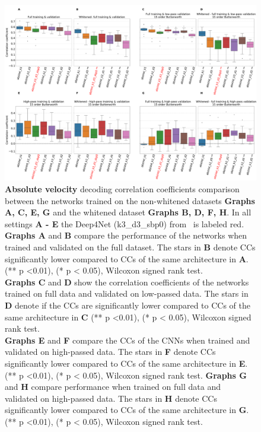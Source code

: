 \begin{figure}[!htbp]
   \includegraphics[width=1\linewidth]{img/ch4/absVel-pw-vs-non-pw-performance}
\caption[Spectral whitening - performance comparison]{\textbf{Absolute velocity} decoding correlation coefficients comparison between the networks trained on the non-whitened datasets \textbf{Graphs A, C, E, G} and the whitened dataset \textbf{Graphs B, D, F, H}.
   In all settings \textbf{A - E} the Deep4Net (k3\_d3\_sbp0) from~\cite{Hammer-2021} is labeled red.
   \\ \textbf{Graphs A} and \textbf{B} compare the performance of the networks when trained and validated on the full dataset.
   The stars in \textbf{B} denote CCs significantly lower compared to CCs of the same architecture in \textbf{A}. (** p <0.01), (* p < 0.05), Wilcoxon signed rank test.
   \\\textbf{Graphs C} and \textbf{D} show the correlation coefficients of the networks trained on full data and validated on low-passed data.
   The stars in \textbf{D} denote if the CCs are significantly lower compared to CCs of the same architecture in \textbf{C} (** p <0.01), (* p < 0.05), Wilcoxon signed rank test.
   \\\textbf{Graphs E} and \textbf{F} compare the CCs of the CNNs when trained and validated on high-passed data.
   The stars in \textbf{F} denote CCs significantly lower compared to CCs of the same architecture in \textbf{E}. (** p <0.01), (* p < 0.05), Wilcoxon signed rank test.
   \textbf{Graphs G} and \textbf{H} compare performance when trained on full data and validated on high-passed data.
   The stars in \textbf{H} denote CCs significantly lower compared to CCs of the same architecture in \textbf{G}. (** p <0.01), (* p < 0.05), Wilcoxon signed rank test.}
   \label{fig:absVel-pw-performance}
\end{figure}

